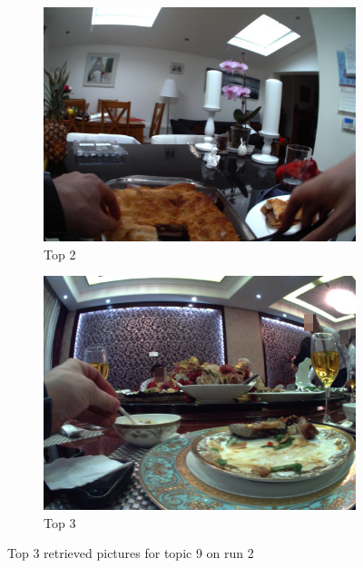 \begin{figure}[H]
\begin{subfigure}{0.32\textwidth}
    \end{subfigure}
    \begin{subfigure}{0.32\textwidth}
    \includegraphics[width=\textwidth]{Sections/7Results/images/run3top2.jpg}\hfill
    \caption{Top 2}
    \end{subfigure}
    \begin{subfigure}{0.32\textwidth}
    \includegraphics[width=\textwidth]{Sections/7Results/images/run2top3.jpg}\hfill
      \caption{Top 3}
    \end{subfigure}
    \caption{Top 3 retrieved pictures for topic 9 on run 2}
  \end{figure}

  \newpage

